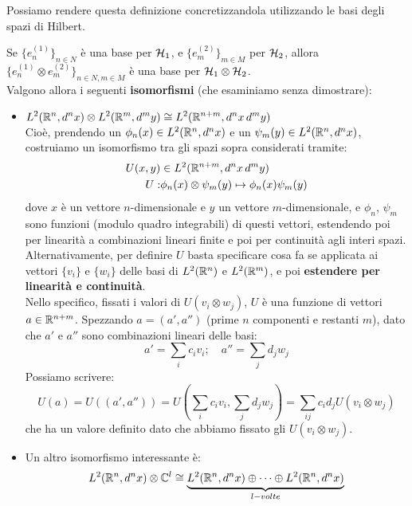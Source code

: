 \documentclass[../../FisicaTeorica.tex]{subfiles}
\begin{document}
Possiamo rendere questa definizione  concretizzandola utilizzando le basi degli spazi di Hilbert.
\begin{thm}
Se $\{e_n^{(1)}\}_{n\in N}$ è una base per $\mathcal{H}_1$, e $\{e_m^{(2)}\}_{m\in M}$ per $\mathcal{H}_2$, allora $\{e_n^{(1)}\otimes e_m^{(2)}\}_{n\in N, m\in M}$ è una base per $\mathcal{H}_1 \otimes \mathcal{H}_2$.\\
Valgono allora i seguenti \textbf{isomorfismi} (che esaminiamo senza dimostrare):
\begin{itemize}
\item 
$\displaystyle
L^2(\mathbb{R}^n, d^nx) \otimes L^2(\mathbb{R}^m,d^my) \cong L^2(\mathbb{R}^{n+m}, d^n x\,d^m y)
$\\
Cioè, prendendo un $\phi_n(x)\in L^2(\mathbb{R}^n,d^n x)$ e un $\psi_m(y) \in L^2(\mathbb{R}^n, d^n x)$, costruiamo un isomorfismo tra gli spazi sopra considerati tramite: 
\begin{align}
    U(x,y) &\in L^2(\mathbb{R}^{n+m}, d^nx\, d^my)\\
    U: &\phi_n(x) \otimes \psi_m(y) \mapsto \phi_n(x)\psi_m(y)
\end{align}
dove $x$ è un vettore $n$-dimensionale e $y$ un vettore $m$-dimensionale, e $\phi_n$, $\psi_m$ sono funzioni (modulo quadro integrabili) di questi vettori, estendendo poi per linearità a combinazioni lineari finite e poi per continuità agli interi spazi.\\
Alternativamente, per definire $U$ basta specificare cosa fa se applicata ai vettori $\{v_i\}$ e $\{w_i\}$ delle basi di $L^2(\mathbb{R}^n)$ e $L^2(\mathbb{R}^m)$, e poi \textbf{estendere per linearità e continuità}.\\
Nello specifico, fissati i valori di $U(v_i \otimes w_j)$, $U$ è una funzione di vettori $a \in \mathbb{R}^{n+m}$. Spezzando $a = (a', a'')$ (prime $n$ componenti e restanti $m$), dato che $a'$ e $a''$ sono combinazioni lineari delle basi:
\[
a' = \sum_i c_i v_i; \quad a'' = \sum_j d_j w_j
\]
Possiamo scrivere:
\[
U(a)=U((a',a''))= U\left(\sum_{i} c_i v_i, \sum_j d_j w_j\right)= \sum_{ij} c_i d_j U(v_i \otimes w_j)
\]
che ha un valore definito dato che abbiamo fissato gli $U(v_i \otimes w_j)$.
\item Un altro isomorfismo interessante è:
\begin{align}
L^2(\mathbb{R}^n, d^nx) \otimes \mathbb{C}^l \cong \underbrace{L^2(\mathbb{R}^n, d^n x) \oplus \dots \oplus L^2(\mathbb{R}^n, d^nx)}_{l-volte}
\label{eqn:isomorfismo-prodotto-tensore}
\end{align}
\begin{expl}

\end{expl}
\end{itemize}
\end{thm}
\end{document}
